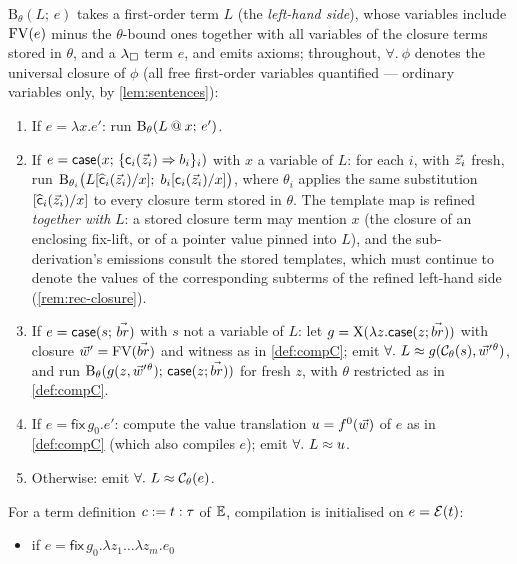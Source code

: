 \begin{definition}
\label{def:compile}
$\mathrm{B}_\theta(L;\, e)$ takes a first-order term $L$ (the
\emph{left-hand side}), whose variables include $\mathrm{FV}(e)$ minus the
$\theta$-bound ones together with all variables of the closure terms
stored in $\theta$, and a $\lambda_{\square}$ term $e$, and emits axioms;
throughout, $\forall.\ \phi$ denotes the universal closure of $\phi$
(all free first-order variables quantified --- ordinary variables
only, by \cref{lem:sentences}):
\begin{enumerate}[leftmargin=2em]
\item If $e = \lambda x.e'$: run $\mathrm{B}_\theta(L \mathbin{@} x;\, e')$.
\item If $e = \mathsf{case}(x;\, \{\mathsf{c}_i(\vec{z}_i) \Rightarrow
  b_i\}_i)$ with $x$ a variable of $L$: for each $i$, with $\vec{z}_i$
  fresh, run
  $\mathrm{B}_{\theta_i}\bigl(
    L[\widehat{\mathsf{c}}_i(\vec{z}_i)/x];\;
    b_i[\mathsf{c}_i(\vec{z}_i)/x]\bigr)$,
  where $\theta_i$ applies the same substitution
  $[\widehat{\mathsf{c}}_i(\vec{z}_i)/x]$ to every closure term stored in
  $\theta$.  The template map is refined \emph{together with} $L$: a
  stored closure term may mention $x$ (the closure of an enclosing
  fix-lift, or of a pointer value pinned into $L$), and the
  sub-derivation's emissions consult the stored templates, which must
  continue to denote the values of the corresponding subterms of the
  refined left-hand side (\cref{rem:rec-closure}).
\item If $e = \mathsf{case}(s;\, \vec{br})$ with $s$ not a variable of
  $L$: let $g = \mathrm{X}(\lambda z.\mathsf{case}(z;\vec{br}))$ with
  closure $\vec{w}' = \mathrm{FV}(\vec{br})$ and witness as in \cref{def:compC};
  emit $\forall.\ L \approx g(\mathcal{C}_\theta(s), \vec{w}'{}^{\theta})$,
  and run $\mathrm{B}_\theta(g(z, \vec{w}'{}^{\theta});\,
  \mathsf{case}(z; \vec{br}))$ for fresh $z$, with $\theta$ restricted
  as in \cref{def:compC}.
\item If $e = \mathsf{fix}\,g_0.e'$: compute the value translation $u =
  f^0(\vec{w})$ of $e$ as in \cref{def:compC} (which also compiles $e$);
  emit $\forall.\ L \approx u$.
\item Otherwise: emit $\forall.\ L \approx \mathcal{C}_\theta(e)$.
\end{enumerate}
For a term definition $c \mathrel{:=} t : \tau$ of $\mathbb{E}$, compilation is
initialised on $e = \mathcal{E}(t)$:
\begin{itemize}[leftmargin=2em]
\item if $e = \mathsf{fix}\,g_0.\lambda z_1 \dots \lambda z_m.e_0$

\end{itemize}
\end{definition}
